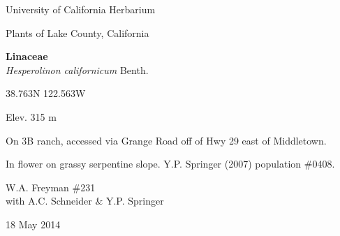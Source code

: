 \documentclass[letterpaper,10pt]{article}
\begin{document}
\begin{minipage}[t]{0.40\textwidth}

\begin{center}
University of California Herbarium \\
\begin{large}
Plants of Lake County, California \\
\end{large}
\vspace{\baselineskip}
\textbf{Linaceae} \\
\textit{Hesperolinon californicum} Benth.\\
\end{center}

\begin{footnotesize}

\begin{multicols}{2}
38.763\textdegree N 122.563\textdegree W
\columnbreak
\begin{flushright}
Elev. 315 m
\end{flushright}
\end{multicols}

On 3B ranch, accessed via Grange Road off of Hwy 29 east of Middletown.
\vspace{\baselineskip}

In flower on grassy serpentine slope. Y.P. Springer (2007) population \#0408.

\begin{multicols}{2}
W.A. Freyman \#231 \\
with A.C. Schneider \& Y.P. Springer
\columnbreak
\begin{flushright}
18 May 2014
\end{flushright}
\end{multicols}

\end{footnotesize}

\end{minipage}

\vspace{2cm}
%
%

%
%
\end{document}
